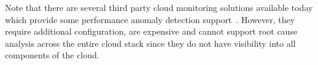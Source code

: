 

Note that there are several
third party cloud monitoring solutions available today which provide some performance
anomaly detection support~\cite{newrelic,datadog,dynatrace}. 
However, they require additional configuration, are expensive
and cannot support root cause analysis across the entire cloud stack since they do not
have visibility into all components of the cloud.
